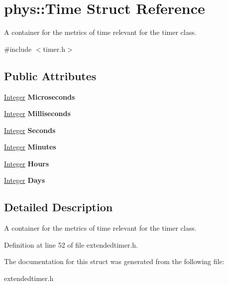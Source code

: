 \hypertarget{structphys_1_1Time}{
\section{phys::Time Struct Reference}
\label{de/db1/structphys_1_1Time}
}


A container for the metrics of time relevant for the timer class.  




{\ttfamily \#include $<$timer.h$>$}

\subsection*{Public Attributes}
\begin{DoxyCompactItemize}
\item 
\hypertarget{structphys_1_1Time_ad0e070fdec0d826d73dc01f5ee4dddc7}{
\hyperlink{namespacephys_a7f09bf5585b2bb97613cd9aad4273a81}{Integer} {\bfseries Microseconds}}
\label{de/db1/structphys_1_1Time_ad0e070fdec0d826d73dc01f5ee4dddc7}

\item 
\hypertarget{structphys_1_1Time_afeb0b8025b7cea824a84523565d7dd60}{
\hyperlink{namespacephys_a7f09bf5585b2bb97613cd9aad4273a81}{Integer} {\bfseries Milliseconds}}
\label{de/db1/structphys_1_1Time_afeb0b8025b7cea824a84523565d7dd60}

\item 
\hypertarget{structphys_1_1Time_aa526d7de0d2fde457dc458d7ee6285d1}{
\hyperlink{namespacephys_a7f09bf5585b2bb97613cd9aad4273a81}{Integer} {\bfseries Seconds}}
\label{de/db1/structphys_1_1Time_aa526d7de0d2fde457dc458d7ee6285d1}

\item 
\hypertarget{structphys_1_1Time_a142f48583baee67495ea65acf76cbdd5}{
\hyperlink{namespacephys_a7f09bf5585b2bb97613cd9aad4273a81}{Integer} {\bfseries Minutes}}
\label{de/db1/structphys_1_1Time_a142f48583baee67495ea65acf76cbdd5}

\item 
\hypertarget{structphys_1_1Time_aceeebc7a8950d38fb9c9bcf483a5a751}{
\hyperlink{namespacephys_a7f09bf5585b2bb97613cd9aad4273a81}{Integer} {\bfseries Hours}}
\label{de/db1/structphys_1_1Time_aceeebc7a8950d38fb9c9bcf483a5a751}

\item 
\hypertarget{structphys_1_1Time_aab43bd475fab9342887b0762281e80a4}{
\hyperlink{namespacephys_a7f09bf5585b2bb97613cd9aad4273a81}{Integer} {\bfseries Days}}
\label{de/db1/structphys_1_1Time_aab43bd475fab9342887b0762281e80a4}

\end{DoxyCompactItemize}


\subsection{Detailed Description}
A container for the metrics of time relevant for the timer class. 

Definition at line 52 of file extendedtimer.h.



The documentation for this struct was generated from the following file:\begin{DoxyCompactItemize}
\item 
extendedtimer.h\end{DoxyCompactItemize}
